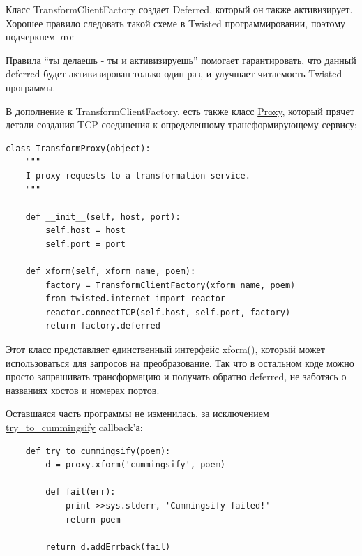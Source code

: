 Класс TransformClientFactory создает Deferred, который он также 
активизирует. Хорошее правило следовать такой схеме в 
Twisted программировании, поэтому подчеркнем это:




Правила ``ты делаешь - ты и активизируешь'' помогает гарантировать, 
что данный deferred будет активизирован только один раз, и 
улучшает читаемость Twisted программы.


В дополнение к TransformClientFactory, есть также класс 
\href{http://github.com/jdavisp3/twisted-intro/blob/master/twisted-client-6/get-poetry.py#L122}{Proxy}, 
который прячет детали создания TCP соединения к определенному 
трансформирующему сервису:

\begin{scriptsize}\begin{verbatim}
class TransformProxy(object):
    """
    I proxy requests to a transformation service.
    """

    def __init__(self, host, port):
        self.host = host
        self.port = port

    def xform(self, xform_name, poem):
        factory = TransformClientFactory(xform_name, poem)
        from twisted.internet import reactor
        reactor.connectTCP(self.host, self.port, factory)
        return factory.deferred
\end{verbatim}\end{scriptsize}


Этот класс представляет единственный интерфейс xform(), 
который может использоваться для запросов на преобразование. 
Так что в остальном коде можно просто запрашивать трансформацию и 
получать обратно deferred, не заботясь о названиях хостов и 
номерах портов. 


Оставшаяся часть программы не изменилась, за исключением 
\href{http://github.com/jdavisp3/twisted-intro/blob/master/twisted-client-6/get-poetry.py#L163}{try\_to\_cummingsify} callback'а:

\begin{scriptsize}\begin{verbatim}
    def try_to_cummingsify(poem):
        d = proxy.xform('cummingsify', poem)

        def fail(err):
            print >>sys.stderr, 'Cummingsify failed!'
            return poem

        return d.addErrback(fail)
\end{verbatim}\end{scriptsize}


